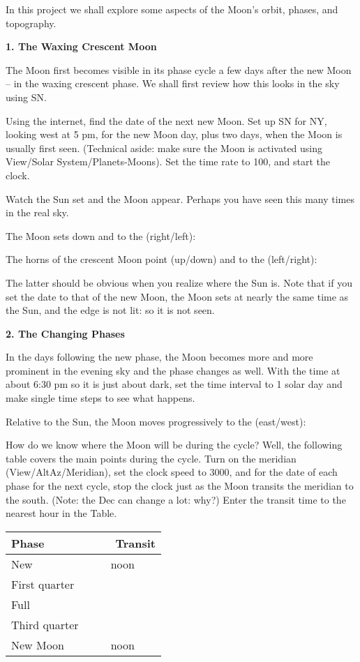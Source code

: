 
\noindent
In this project we shall explore some aspects of the Moon's orbit,
phases, and topography.


\medskip \bigskip
\noindent
{\bf 1. The Waxing Crescent Moon}

\medskip\noindent The Moon first becomes visible in its phase cycle a
few days after the new Moon -- in the waxing crescent phase. 
We shall first review how this looks in
the sky using SN.

Using the internet, find the date of the next new Moon. Set up SN for
NY, looking west at 5 pm, for the new Moon day, plus two days, when
the Moon is usually first seen. (Technical aside: make sure the Moon
is activated using View/Solar System/Planets-Moons). Set the time rate
to 100, and start the clock.

Watch the Sun set and the Moon appear. Perhaps you have seen this many
times in the real sky.

\medskip
The Moon sets down and to the (right/left): \makebox[2cm]{\hrulefill}

The horns of the crescent Moon point (up/down) and to the (left/right): \makebox[2cm]{\hrulefill}

\medskip\noindent
The latter should be obvious when you realize where the Sun is. Note
that if you set the date to that of the new Moon, the
Moon sets at nearly the same time as the Sun, and the edge is not lit:
so it is not seen.

\bigskip
\noindent
{\bf 2. The Changing Phases}

\medskip \noindent
In the days following the new phase, the Moon becomes more and more
prominent in the evening sky and the phase changes as well.
With the time at about 6:30 pm so it is just about dark, set the time
interval to 1 solar day and make single time steps to see what happens.

\medskip
Relative to the Sun, the Moon moves progressively to the (east/west): \makebox[2cm]{\hrulefill}

\noindent \medskip
How do we know where the Moon will be during the cycle? Well, the
following table covers the main points during the cycle. Turn on the
meridian (View/AltAz/Meridian), set the clock speed to 3000,
and for the date of each phase for the next cycle,
stop the clock just as the Moon transits the meridian to the
south. (Note: the Dec can change a lot: why?) Enter the transit time to the
nearest hour in the Table.

\bigskip
\begin{center}
\begin{tabular}{lc} \hline
Phase  & \ \ \ \ Transit  \\
 \hline
New   &    noon    \\ \hline
First quarter   &        \\ \hline
Full   &    \\ \hline
Third quarter   &        \\ \hline
New Moon    &  noon     \\ \hline
\end{tabular}
\end{center}

